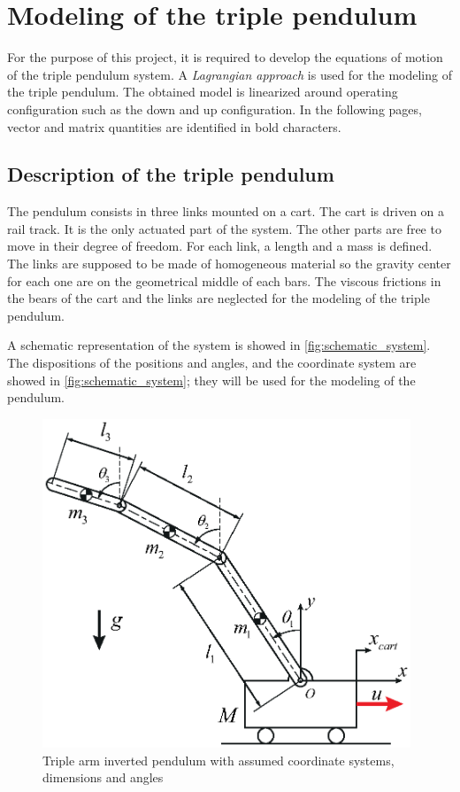 \documentclass[a4paper,12pt]{article}
\begin{document}
\section{Modeling of the triple pendulum}
For the purpose of this project, it is required to develop the equations of motion of the triple pendulum system. A \emph{Lagrangian approach} is used for the modeling of the triple pendulum. The obtained model is linearized around operating configuration such as the down and up configuration. In the following pages, vector and matrix quantities are identified in bold characters.

\subsection{Description of the triple pendulum}
The pendulum consists in three links mounted on a cart. The cart is driven on a rail track. It is the only actuated part of the system. The other parts are free to move in their degree of freedom. For each link, a length and a mass is defined. The links are supposed to be made of homogeneous material so the gravity center for each one are on the geometrical middle of each bars. The viscous frictions in the bears of the cart and the links are neglected for the modeling of the triple pendulum.

A schematic representation of the system is showed in \autoref{fig:schematic_system}. The dispositions of the positions and angles, and the coordinate system are showed in \autoref{fig:schematic_system}; they will be used for the modeling of the pendulum.
\begin{figure}[ht]
	\centering
	\includegraphics[width=11cm]{illustrations/schematic_system.eps}
	\caption{Triple arm inverted pendulum with assumed coordinate systems, dimensions and angles}
	\label{fig:schematic_system}
\end{figure}
\end{document}
